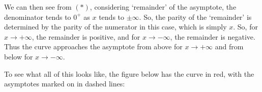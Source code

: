 \documentclass[11pt, a4paper]{article}
\begin{document}
We can then see from $(*)$, considering `remainder' of the asymptote, the denominator tends to $0^{+}$ as $x$ tends to $\pm\infty$. So, the parity of the `remainder' is determined by the parity of the numerator in this case, which is simply $x$. So, for $x\rightarrow+\infty$, the remainder is positive, and for $x\rightarrow-\infty$, the remainder is negative. Thus the curve approaches the asymptote from above for $x\rightarrow+\infty$ and from below for $x\rightarrow-\infty$. \newline \par

To see what all of this looks like, the figure below has the curve in red, with the asymptotes marked on in dashed lines:

\begin{figure}[H]
\centering
\begin{subfigure}[b]{0.89\textwidth}
\centering
{}
\end{subfigure}
\end{figure}

\vspace{0.5cm}
\end{document}
